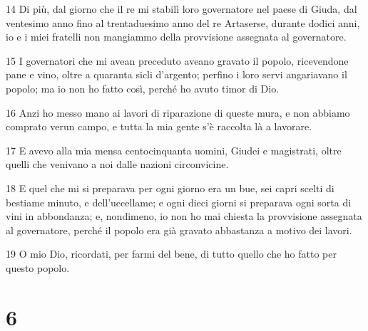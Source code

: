 \par 14 Di più, dal giorno che il re mi stabilì loro governatore nel paese di Giuda, dal ventesimo anno fino al trentaduesimo anno del re Artaserse, durante dodici anni, io e i miei fratelli non mangiammo della provvisione assegnata al governatore.
\par 15 I governatori che mi avean preceduto aveano gravato il popolo, ricevendone pane e vino, oltre a quaranta sicli d'argento; perfino i loro servi angariavano il popolo; ma io non ho fatto così, perché ho avuto timor di Dio.
\par 16 Anzi ho messo mano ai lavori di riparazione di queste mura, e non abbiamo comprato verun campo, e tutta la mia gente s'è raccolta là a lavorare.
\par 17 E avevo alla mia mensa centocinquanta uomini, Giudei e magistrati, oltre quelli che venivano a noi dalle nazioni circonvicine.
\par 18 E quel che mi si preparava per ogni giorno era un bue, sei capri scelti di bestiame minuto, e dell'uccellame; e ogni dieci giorni si preparava ogni sorta di vini in abbondanza; e, nondimeno, io non ho mai chiesta la provvisione assegnata al governatore, perché il popolo era già gravato abbastanza a motivo dei lavori.
\par 19 O mio Dio, ricordati, per farmi del bene, di tutto quello che ho fatto per questo popolo.

\chapter{6}

